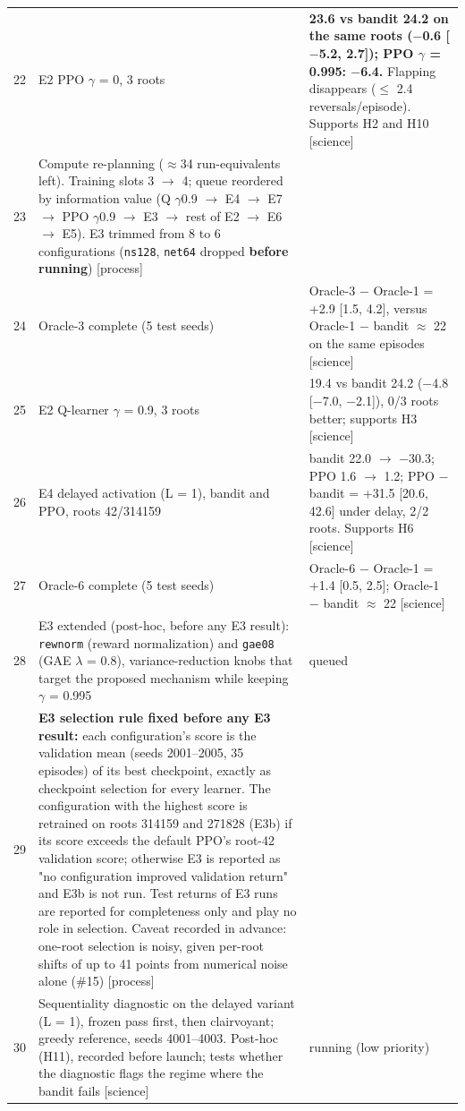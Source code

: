 {\begin{longtable}{@{}rp{}p{}@{}}
22 & E2 PPO $\gamma$ = 0, 3 roots & \textbf{23.6 vs bandit 24.2 on the same roots ($-$0.6 [$-$5.2, 2.7]); PPO $\gamma$ = 0.995: $-$6.4.} Flapping disappears ($\le$ 2.4 reversals/episode). Supports H2 and H10 [science] \\
23 & Compute re-planning ($\approx$34 run-equivalents left). Training slots 3 $\to$ 4; queue reordered by information value (Q $\gamma$0.9 $\to$ E4 $\to$ E7 $\to$ PPO $\gamma$0.9 $\to$ E3 $\to$ rest of E2 $\to$ E6 $\to$ E5). E3 trimmed from 8 to 6 configurations (\texttt{ns128}, \texttt{net64} dropped \textbf{before running}) [process] &  \\
24 & Oracle-3 complete (5 test seeds) & Oracle-3 $-$ Oracle-1 = +2.9 [1.5, 4.2], versus Oracle-1 $-$ bandit $\approx$ 22 on the same episodes [science] \\
25 & E2 Q-learner $\gamma$ = 0.9, 3 roots & 19.4 vs bandit 24.2 ($-$4.8 [$-$7.0, $-$2.1]), 0/3 roots better; supports H3 [science] \\
26 & E4 delayed activation (L = 1), bandit and PPO, roots 42/314159 & bandit 22.0 $\to$ $-$30.3; PPO 1.6 $\to$ 1.2; PPO $-$ bandit = +31.5 [20.6, 42.6] under delay, 2/2 roots. Supports H6 [science] \\
27 & Oracle-6 complete (5 test seeds) & Oracle-6 $-$ Oracle-1 = +1.4 [0.5, 2.5]; Oracle-1 $-$ bandit $\approx$ 22 [science] \\
28 & E3 extended (post-hoc, before any E3 result): \texttt{rewnorm} (reward normalization) and \texttt{gae08} (GAE $\lambda$ = 0.8), variance-reduction knobs that target the proposed mechanism while keeping $\gamma$ = 0.995 & queued \\
29 & \textbf{E3 selection rule fixed before any E3 result:} each configuration's score is the validation mean (seeds 2001--2005, 35 episodes) of its best checkpoint, exactly as checkpoint selection for every learner. The configuration with the highest score is retrained on roots 314159 and 271828 (E3b) if its score exceeds the default PPO's root-42 validation score; otherwise E3 is reported as "no configuration improved validation return" and E3b is not run. Test returns of E3 runs are reported for completeness only and play no role in selection. Caveat recorded in advance: one-root selection is noisy, given per-root shifts of up to 41 points from numerical noise alone (\#15) [process] &  \\
30 & Sequentiality diagnostic on the delayed variant (L = 1), frozen pass first, then clairvoyant; greedy reference, seeds 4001--4003. Post-hoc (H11), recorded before launch; tests whether the diagnostic flags the regime where the bandit fails [science] & running (low priority) \\

\end{longtable}}
